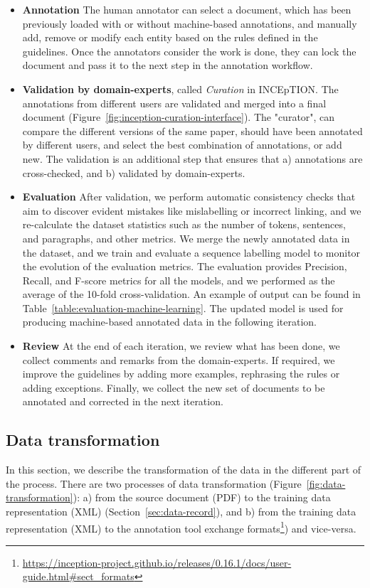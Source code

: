\documentclass[fleqn,10pt]{wlscirep}
\begin{document}
\begin{itemize}
\item \textbf{Annotation} The human annotator can select a document, which has been previously loaded with or without machine-based annotations, and manually add, remove or modify each entity based on the rules defined in the guidelines. Once the annotators consider the work is done, they can lock the document and pass it to the next step in the annotation workflow. 

\item \textbf{Validation by domain-experts}, called \textit{Curation} in INCEpTION. 
The annotations from different users are validated and merged into a final document (Figure~\ref{fig:inception-curation-interface}). 
The "curator", can compare the different versions of the same paper, should have been annotated by different users, and select the best combination of annotations, or add new. 
The validation is an additional step that ensures that a) annotations are cross-checked, and b) validated by domain-experts.

\item \textbf{Evaluation} After validation, we perform automatic consistency checks that aim to discover evident mistakes like mislabelling or incorrect linking, and we re-calculate the dataset statistics such as the number of tokens, sentences, and paragraphs, and other metrics. 
We merge the newly annotated data in the dataset, and we train and evaluate a sequence labelling model to monitor the evolution of the evaluation metrics. The evaluation provides Precision, Recall, and F-score metrics for all the models, and we performed as the average of the 10-fold cross-validation. An example of output can be found in Table~\ref{table:evaluation-machine-learning}.
The updated model is used for producing machine-based annotated data in the following iteration.

\item \textbf{Review} At the end of each iteration, we review what has been done, we collect comments and remarks from the domain-experts. 
If required, we improve the guidelines by adding more examples, rephrasing the rules or adding exceptions. 
Finally, we collect the new set of documents to be annotated and corrected in the next iteration. 
\end{itemize}

\subsection*{Data transformation}
\label{subsec:transformation-of-data}
In this section, we describe the transformation of the data in the different part of the process. 
There are two processes of data transformation (Figure~\ref{fig:data-transformation}): a) from the source document (PDF) to the training data representation (XML) (Section~\ref{sec:data-record}), and b) from the training data representation (XML) to the annotation tool exchange formats\footnote{\url{https://inception-project.github.io/releases/0.16.1/docs/user-guide.html\#sect_formats}}) and vice-versa. 
\end{document}
